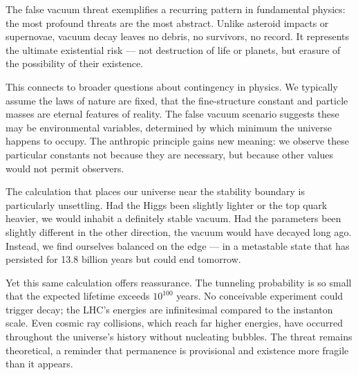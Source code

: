 \begin{commentary}
The false vacuum threat exemplifies a recurring pattern in fundamental physics: the most profound threats are the most abstract. Unlike asteroid impacts or supernovae, vacuum decay leaves no debris, no survivors, no record. It represents the ultimate existential risk — not destruction of life or planets, but erasure of the possibility of their existence.

This connects to broader questions about contingency in physics. We typically assume the laws of nature are fixed, that the fine-structure constant and particle masses are eternal features of reality. The false vacuum scenario suggests these may be environmental variables, determined by which minimum the universe happens to occupy. The anthropic principle gains new meaning: we observe these particular constants not because they are necessary, but because other values would not permit observers.

The calculation that places our universe near the stability boundary is particularly unsettling. Had the Higgs been slightly lighter or the top quark heavier, we would inhabit a definitely stable vacuum. Had the parameters been slightly different in the other direction, the vacuum would have decayed long ago. Instead, we find ourselves balanced on the edge — in a metastable state that has persisted for 13.8 billion years but could end tomorrow.

Yet this same calculation offers reassurance. The tunneling probability is so small that the expected lifetime exceeds $10^{100}$ years. No conceivable experiment could trigger decay; the LHC's energies are infinitesimal compared to the instanton scale. Even cosmic ray collisions, which reach far higher energies, have occurred throughout the universe's history without nucleating bubbles. The threat remains theoretical, a reminder that permanence is provisional and existence more fragile than it appears.
\end{commentary}
